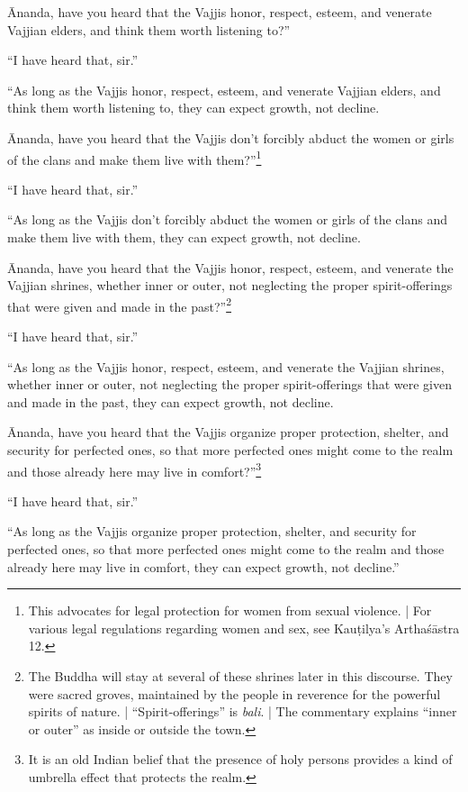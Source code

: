 \documentclass[12pt,openany]{book}%
\begin{document}
Ānanda, have you heard that the Vajjis honor, respect, esteem, and venerate Vajjian elders, and think them worth listening to?” 

“I have heard that, sir.” 

“As long as the Vajjis honor, respect, esteem, and venerate Vajjian elders, and think them worth listening to, they can expect growth, not decline. 

Ānanda, have you heard that the Vajjis don’t forcibly abduct the women or girls of the clans and make them live with them?”\footnote{This advocates for legal protection for women from sexual violence. | For various legal regulations regarding women and sex, see \textsanskrit{Kauṭilya}’s \textsanskrit{Arthaśāstra} 12. } 

“I have heard that, sir.” 

“As long as the Vajjis don’t forcibly abduct the women or girls of the clans and make them live with them, they can expect growth, not decline. 

Ānanda, have you heard that the Vajjis honor, respect, esteem, and venerate the Vajjian shrines, whether inner or outer, not neglecting the proper spirit-offerings that were given and made in the past?”\footnote{The Buddha will stay at several of these shrines later in this discourse. They were sacred groves, maintained by the people in reverence for the powerful spirits of nature. | “Spirit-offerings” is \textit{bali}. | The commentary explains “inner or outer” as inside or outside the town. } 

“I have heard that, sir.” 

“As long as the Vajjis honor, respect, esteem, and venerate the Vajjian shrines, whether inner or outer, not neglecting the proper spirit-offerings that were given and made in the past, they can expect growth, not decline. 

Ānanda, have you heard that the Vajjis organize proper protection, shelter, and security for perfected ones, so that more perfected ones might come to the realm and those already here may live in comfort?”\footnote{It is an old Indian belief that the presence of holy persons provides a kind of umbrella effect that protects the realm. } 

“I have heard that, sir.” 

“As long as the Vajjis organize proper protection, shelter, and security for perfected ones, so that more perfected ones might come to the realm and those already here may live in comfort, they can expect growth, not decline.” 
\end{document}
